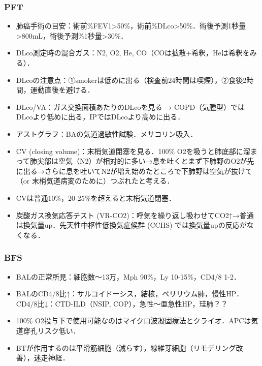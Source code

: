 \subsubsection{PFT}

\begin{itemize}

\item 肺癌手術の目安：術前\%FEV1>50\%，術前\%DLco>50\%．術後予測1秒量>800mL，術後予測\%1秒量>30\%．
\item DLco測定時の混合ガス：N2, O2, He, CO（COは拡散+希釈，Heは希釈をみる）．
\item DLcoの注意点：①smokerは低めに出る（検査前24時間は喫煙），②食後2時間，運動直後を避ける．
\item DLco/VA：ガス交換面積あたりのDLcoを見る → COPD（気腫型）ではDLcoより低めに出る，IPではDLcoより高めに出る．
\item アストグラフ：BAの気道過敏性試験．メサコリン吸入．
\item CV (closing volume)：末梢気道閉塞を見る．100\% O2を吸うと肺底部に溜まって肺尖部は空気（N2）が相対的に多い→息を吐くとまず下肺野のO2が先に出る→さらに息を吐いてN2が増え始めたところで下肺野は空気が抜けて（or 末梢気道病変のために）つぶれたと考える．\item CVは普通10\%，20-25\%を超えると末梢気道閉塞．
\item 炭酸ガス換気応答テスト (VR-CO2)：呼気を繰り返し吸わせてCO2↑→普通は換気量up．先天性中枢性低換気症候群 (CCHS) では換気量upの反応がなくなる．

\end{itemize}

\subsubsection{BFS}

\begin{itemize}
\item BALの正常所見：細胞数〜13万，Mph 90\%，Ly 10-15\%，CD4/8 1-2．
\item BALのCD4/8比↑：サルコイドーシス，結核，ベリリウム肺，慢性HP．CD4/8比↓：CTD-ILD（NSIP, COP），急性〜亜急性HP，珪肺？？
\item 100\% O2投与下で使用可能なのはマイクロ波凝固療法とクライオ．APCは気道穿孔リスク低い．
\item BTが作用するのは平滑筋細胞（減らす），線維芽細胞（リモデリング改善），迷走神経．


\end{itemize}

